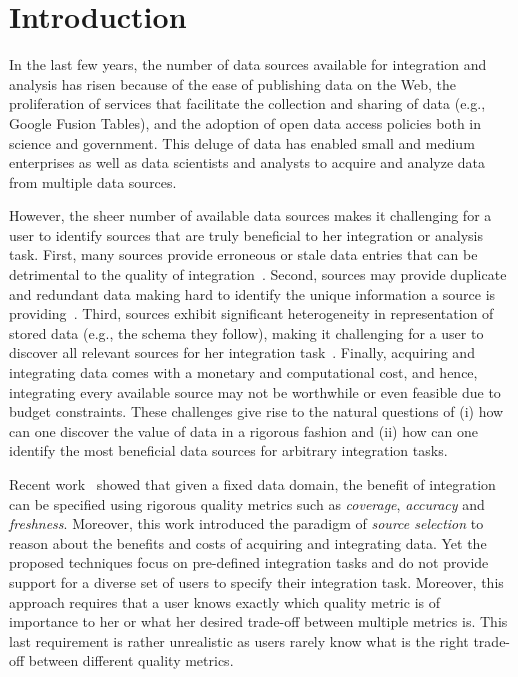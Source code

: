 \documentclass{sig-alternate}
\begin{document}
\section{Introduction}
In the last few years, the number of data sources available for integration and analysis has risen because of the ease of publishing data on the Web, the proliferation of services that facilitate the collection and sharing of data (e.g., Google Fusion Tables), and  the adoption of open data access policies both in science and government. This deluge of data has enabled small and medium enterprises as well as data scientists and analysts to acquire and analyze data from multiple data sources. 

However, the sheer number of available data sources makes it challenging for a user to identify sources that are truly beneficial to her integration or analysis task. First, many sources provide erroneous or stale data entries that can be detrimental to the quality of integration~\cite{Dong_vldb:2009, li:2012}. Second,  sources may provide  duplicate and redundant data making hard to identify the unique information a source is providing~\cite{bronzi:2013, li:2012}. Third, sources exhibit significant heterogeneity in representation of stored data (e.g., the schema they follow), making it challenging for a user to discover all relevant sources for her integration task~\cite{dassarma:2012}. Finally, acquiring and integrating data comes with a monetary and computational cost, and hence, integrating every available source may not be worthwhile or even feasible due to budget constraints. These challenges give rise to the natural questions of (i) how can one discover the value of data in a rigorous fashion and (ii) how can one identify the most beneficial data sources for arbitrary integration tasks. 

Recent work~\cite{dong:vldb13, rekatsinas:2014} showed that given a fixed data domain, the benefit of integration can be specified using rigorous quality metrics such as {\em coverage}, {\em accuracy} and {\em freshness}. Moreover, this work introduced the paradigm of {\em source selection} to reason about the benefits and costs of acquiring and integrating data. Yet the proposed techniques focus on pre-defined integration tasks and do not provide support for a diverse set of users to specify their integration task. Moreover, this approach requires that a user knows exactly which quality metric is of importance to her or what her desired trade-off between multiple metrics is. This last requirement is rather unrealistic as users rarely know what is the right trade-off between different quality metrics. 
\end{document}
